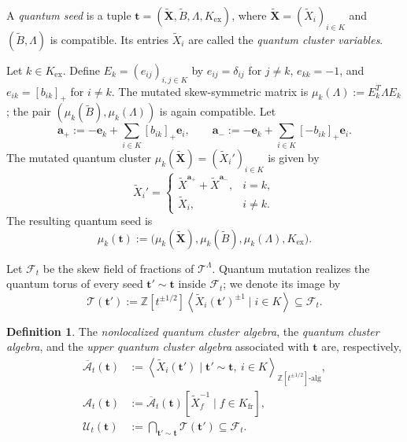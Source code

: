 \documentclass[12pt, reqno]{amsart}
\theoremstyle{plain}
\theoremstyle{definition}
\newtheorem{definition}[theorem]{Definition}
\numberwithin{equation}{section}
\newcommand{\ZZ}{\mathbb{Z}}
\begin{document}
A \emph{quantum seed} is a tuple
\(\mathbf t=(\widetilde{\mathbf X},\widetilde B,
\Lambda,K_{\mathrm{ex}})\), where
\(\widetilde{\mathbf X}=(\widetilde X_i)_{i\in K}\) and
\((\widetilde B,\Lambda)\) is compatible. Its entries
\(\widetilde X_i\) are called the \emph{quantum cluster variables}.

Let \(k\in K_{\mathrm{ex}}\). Define
\(E_k=(e_{ij})_{i,j\in K}\) by \(e_{ij}=\delta_{ij}\) for
\(j\neq k\), \(e_{kk}=-1\), and \(e_{ik}=[b_{ik}]_+\) for
\(i\neq k\). The mutated skew-symmetric matrix is
\(\mu_k(\Lambda):=E_k^T\Lambda E_k\); the pair
\((\mu_k(\widetilde B),\mu_k(\Lambda))\) is again compatible. Let
\[
    \mathbf a_+
    :=-\mathbf e_k+\sum_{i\in K}[b_{ik}]_+\mathbf e_i,
    \qquad
    \mathbf a_-
    :=-\mathbf e_k+\sum_{i\in K}[-b_{ik}]_+\mathbf e_i.
\]
The mutated quantum cluster
\(\mu_k(\widetilde{\mathbf X})=(\widetilde X_i')_{i\in K}\) is given by
\begin{equation}\label{eq:quantum-cluster-mutation}
    \widetilde X_i'=
    \begin{cases}
        \widetilde X^{\mathbf a_+}
        +\widetilde X^{\mathbf a_-},
        & i=k,\\
        \widetilde X_i,
        & i\neq k.
    \end{cases}
\end{equation}
The resulting quantum seed is
\begin{equation}\label{eq:quantum-seed-mutation}
    \mu_k(\mathbf t)
    :=\bigl(
        \mu_k(\widetilde{\mathbf X}),
        \mu_k(\widetilde B),
        \mu_k(\Lambda),
        K_{\mathrm{ex}}
    \bigr).
\end{equation}

Let \(\mathcal F_t\) be the skew field of fractions of
\(\mathcal T^\Lambda\). Quantum mutation realizes the quantum torus of every
seed \(\mathbf t'\sim\mathbf t\) inside \(\mathcal F_t\); we denote its
image by
\[    \mathcal T(\mathbf t')
    :=\ZZ[t^{\pm1/2}]
      \left\langle
          \widetilde X_i(\mathbf t')^{\pm1}
          \mid i\in K
      \right\rangle
      \subseteq\mathcal F_t.
\]

\begin{definition}
    The \emph{nonlocalized quantum cluster algebra}, the
    \emph{quantum cluster algebra}, and the
    \emph{upper quantum cluster algebra} associated with \(\mathbf t\) are,
    respectively,
    \begin{align*}
        \overline{\mathcal A}_t(\mathbf t)
        &:=\left\langle
            \widetilde X_i(\mathbf t')
            \mid \mathbf t'\sim\mathbf t,\ i\in K
        \right\rangle_{\ZZ[t^{\pm1/2}]\text{-alg}},\\
        \mathcal A_t(\mathbf t)
        &:=\overline{\mathcal A}_t(\mathbf t)
            [\widetilde X_f^{-1}\mid f\in K_{\mathrm{fr}}],\\
        \mathcal U_t(\mathbf t)
        &:=\bigcap_{\mathbf t'\sim\mathbf t}
            \mathcal T(\mathbf t')
            \subseteq\mathcal F_t.
    \end{align*}
\end{definition}
\end{document}
